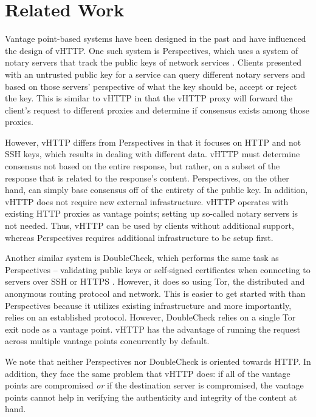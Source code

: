 \section{Related Work}
\label{sec:related}

Vantage point-based systems have been designed in the past and have influenced
the design of vHTTP. One such system is Perspectives, which uses a system of
notary servers that track the public keys of network services
\cite{Perspectives}. Clients presented with an untrusted public key for a
service can query different notary servers and based on those servers'
perspective of what the key should be, accept or reject the key. This is
similar to vHTTP in that the vHTTP proxy will forward the client's request to
different proxies and determine if consensus exists among those proxies.

However, vHTTP differs from Perspectives in that it focuses on HTTP and not
SSH keys, which results in dealing with different data. vHTTP must determine
consensus not based on the entire response, but rather, on a subset of the
response that is related to the response's content. Perspectives, on the other
hand, can simply base consensus off of the entirety of the public key. In
addition, vHTTP does not require new external infrastructure. vHTTP operates
with existing HTTP proxies as vantage points; setting up so-called notary
servers is not needed. Thus, vHTTP can be used by clients without additional
support, whereas Perspectives requires additional infrastructure to be setup
first.

Another similar system is DoubleCheck, which performs the same task as
Perspectives – validating public keys or self-signed certificates when
connecting to servers over SSH or HTTPS \cite{DoubleCheck}. However, it does
so using Tor, the distributed and anonymous routing protocol and network. This
is easier to get started with than Perspectives because it utilizes existing
infrastructure and more importantly, relies on an established protocol.
However, DoubleCheck relies on a single Tor exit node as a vantage point.
vHTTP has the advantage of running the request across multiple vantage points
concurrently by default.

We note that neither Perspectives nor DoubleCheck is oriented towards HTTP. In
addition, they face the same problem that vHTTP does: if all of the vantage
points are compromised \emph{or} if the destination server is compromised, the
vantage points cannot help in verifying the authenticity and integrity of the
content at hand.
